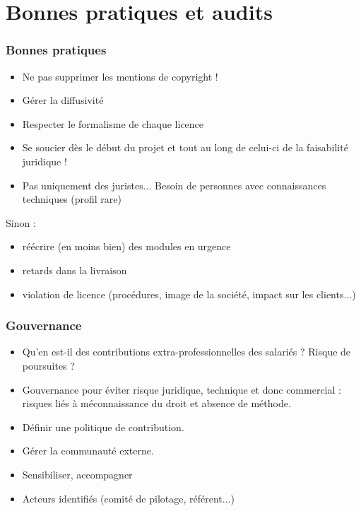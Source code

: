 \documentclass{beamer}
\begin{document}
\section{Bonnes pratiques et audits}


\begin{frame}\frametitle{Bonnes pratiques}
  \begin{itemize}
  \item Ne pas supprimer les mentions de copyright !
  \item Gérer la diffusivité
  \item Respecter le formalisme de chaque licence
  \item Se soucier dès le début du projet et tout au long de celui-ci
    de la faisabilité juridique !
  \item Pas uniquement des juristes... Besoin de personnes avec
    connaissances techniques (profil rare)
  \end{itemize}
  Sinon :
  \begin{itemize}
  \item réécrire (en moins bien) des modules en urgence
  \item retards dans la livraison
  \item violation de licence (procédures, image de la société, impact
    sur les clients...)
  \end{itemize}
\end{frame}

\begin{frame}\frametitle{Gouvernance}

  \begin{itemize}
  \item Qu'en est-il des contributions extra-professionnelles des
    salariés ? Risque de poursuites ?
  \item Gouvernance pour éviter risque juridique, technique et donc
    commercial : risques liés à méconnaissance du droit et absence de
    méthode.
  \item Définir une politique de contribution.
  \item Gérer la communauté externe.
  \item Sensibiliser, accompagner
  \item Acteurs identifiés (comité de pilotage, référent...)
  \end{itemize}
  
\end{frame}
\end{document}
